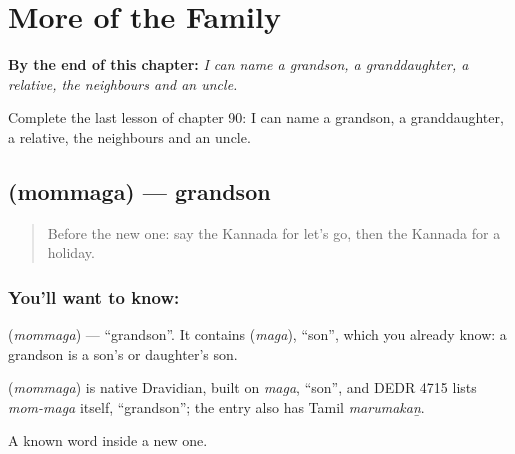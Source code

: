 
\chapter{More of the Family}
\label{ch:ka-more-of-the-family}

\begin{chapteropening}
\textbf{By the end of this chapter:} \emph{I can name a grandson, a granddaughter, a relative, the neighbours and an uncle.}

Complete the last lesson of chapter 90: I can name a grandson, a granddaughter, a relative, the neighbours and an uncle.
\end{chapteropening}

\section[\texorpdfstring{\kn{ಮೊಮ್ಮಗ} (mommaga)}{ಮೊಮ್ಮಗ (mommaga)}]{ (mommaga) — grandson}

\label{lesson:KA-C90-grandson}



\begin{quote}
Before the new one: say the Kannada for let's go, then the Kannada for a holiday.
\end{quote}

\subsection*{You'll want to know: }
\textbf{} (\emph{mommaga}) — \textquotedblleft{}grandson\textquotedblright{}. It contains \textbf{} (\emph{maga}), \textquotedblleft{}son\textquotedblright{}, which you already know: a grandson is a son's or daughter's son.

\begin{cousinweb}
\textbf{} (\emph{mommaga}) is native Dravidian, built on \emph{maga}, \textquotedblleft{}son\textquotedblright{}, and DEDR 4715 lists \emph{mom-maga} itself, \textquotedblleft{}grandson\textquotedblright{}; the entry also has Tamil \emph{marumakaṉ}.
\end{cousinweb}

\begin{grammarlens}[title={What you've built}]
A known word inside a new one.
\end{grammarlens}

